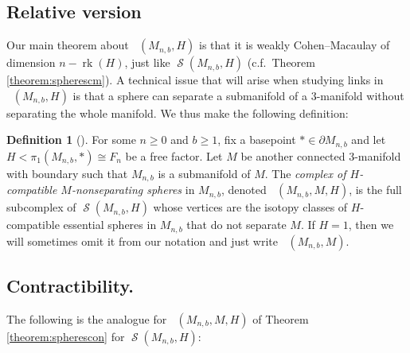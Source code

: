 \documentclass[11pt]{amsart}
\numberwithin{equation}{section}
\theoremstyle{plain}
\theoremstyle{definition}
\newtheorem{defn}[theorem]{Definition}
\newenvironment{definition}[1][]{\begin{defn}[#1]\pushQED{\qed}}{\popQED \end{defn}}
\theoremstyle{remark}
\DeclareMathOperator{\rank}{rk}
\DeclareMathOperator{\Spheres}{\mathcal{S}}
\DeclareMathOperator{\SpheresNS}{\Spheres_{\text{ns}}}
\begin{document}
\subsection{Relative version}
Our main theorem about $\SpheresNS(M_{n,b},H)$ is that it is weakly Cohen--Macaulay of dimension
$n-\rank(H)$, just like $\Spheres(M_{n,b},H)$ (c.f.\ Theorem \ref{theorem:spherescm}).  A technical
issue that will arise when studying links in $\SpheresNS(M_{n,b},H)$ is that a sphere can separate
a submanifold of a $3$-manifold without separating the whole manifold.  We thus make
the following definition:

\begin{definition}
For some $n \geq 0$ and $b \geq 1$, fix a basepoint $\ast \in \partial M_{n,b}$
and let $H < \pi_1(M_{n,b},\ast) \cong F_n$ be a free factor.  Let $M$ be
another connected 3-manifold with boundary such that $M_{n,b}$ is a submanifold of $M$.
The {\em complex of $H$-compatible $M$-nonseparating spheres} in $M_{n,b}$, denoted $\SpheresNS(M_{n,b},M,H)$, is the 
full subcomplex of $\Spheres(M_{n,b},H)$ whose vertices are the isotopy classes
of $H$-compatible essential spheres in $M_{n,b}$ that do not separate $M$.
If $H = 1$, then we will sometimes omit it from our notation and just
write $\SpheresNS(M_{n,b},M)$.
\end{definition}

\subsection{Contractibility.}
The following is the analogue for $\SpheresNS(M_{n,b},M,H)$ of Theorem \ref{theorem:spherescon}
for $\Spheres(M_{n,b},H)$:
\end{document}
